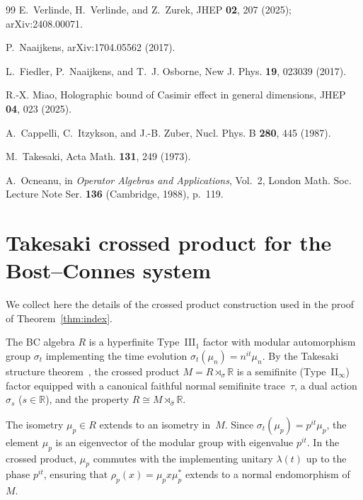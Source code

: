 \documentclass[aps,prl,twocolumn,superscriptaddress,showpacs]{revtex4-2}
\begin{document}
\begin{thebibliography}{99}
E.~Verlinde, H.~Verlinde, and Z.~Zurek,
JHEP \textbf{02}, 207 (2025);
arXiv:2408.00071.

P.~Naaijkens,
arXiv:1704.05562 (2017).

L.~Fiedler, P.~Naaijkens, and T.~J. Osborne,
New J. Phys. \textbf{19}, 023039 (2017).

R.-X. Miao,
Holographic bound of Casimir effect in general dimensions,
JHEP \textbf{04}, 023 (2025).

A.~Cappelli, C.~Itzykson, and J.-B. Zuber,
Nucl. Phys. B \textbf{280}, 445 (1987).

M.~Takesaki,
Acta Math. \textbf{131}, 249 (1973).

A.~Ocneanu,
in \textit{Operator Algebras and Applications}, Vol.~2,
London Math. Soc. Lecture Note Ser. \textbf{136} (Cambridge, 1988), p.~119.

\end{thebibliography}

\appendix

\section{Takesaki crossed product for the Bost--Connes system}
\label{app:crossed}

We collect here the details of the crossed product construction used in the proof of Theorem~\ref{thm:index}.

The BC algebra $R$ is a hyperfinite Type~III$_1$ factor with modular automorphism group $\sigma_t$ implementing the time evolution $\sigma_t(\mu_n) = n^{it}\mu_n$. By the Takesaki structure theorem~\cite{Takesaki1973}, the crossed product $M = R \rtimes_\sigma \mathbb{R}$ is a semifinite (Type~II$_\infty$) factor equipped with a canonical faithful normal semifinite trace~$\tau$, a dual action $\hat{\sigma}_s$ ($s \in \mathbb{R}$), and the property $R \cong M \rtimes_{\hat{\sigma}} \mathbb{R}$.

The isometry $\mu_p \in R$ extends to an isometry in~$M$. Since $\sigma_t(\mu_p) = p^{it}\mu_p$, the element $\mu_p$ is an eigenvector of the modular group with eigenvalue $p^{it}$. In the crossed product, $\mu_p$ commutes with the implementing unitary $\lambda(t)$ up to the phase $p^{it}$, ensuring that $\rho_p(x) = \mu_p x \mu_p^*$ extends to a normal endomorphism of~$M$.
\end{document}
